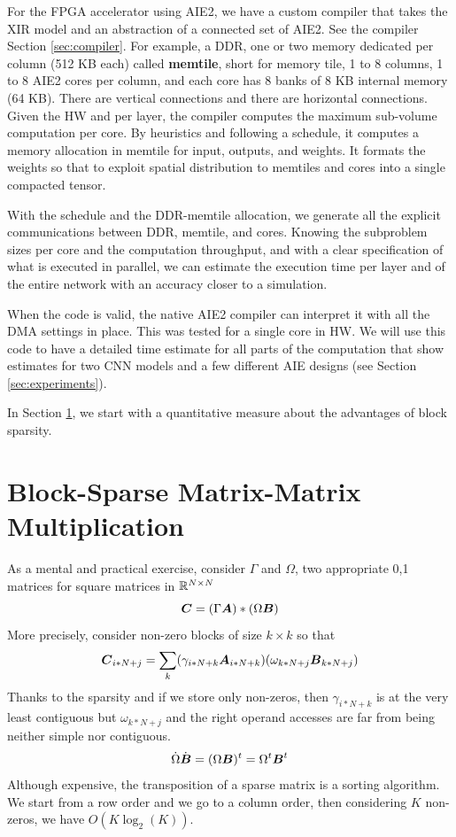 \documentclass[conference]{IEEEtran}
\begin{document}
For the FPGA accelerator using AIE2, we have a custom compiler that
takes the XIR model and an abstraction of a connected set of AIE2. See
the compiler Section \ref{sec:compiler}. For example, a DDR, one or
two memory dedicated per column (512 KB each) called {\bf memtile},
short for memory tile, 1 to 8 columns, 1 to 8 AIE2 cores per column,
and each core has 8 banks of 8 KB internal memory (64 KB). There are
vertical connections and there are horizontal connections. Given the
HW and per layer, the compiler computes the maximum sub-volume
computation per core. By heuristics and following a schedule, it
computes a memory allocation in memtile for input, outputs, and
weights. It formats the weights so that to exploit spatial
distribution to memtiles and cores into a single compacted tensor.

With the schedule and the DDR-memtile allocation, we generate all the
explicit communications between DDR, memtile, and cores. Knowing the
subproblem sizes per core and the computation throughput, and with a
clear specification of what is executed in parallel, we can estimate
the execution time per layer and of the entire network with an
accuracy closer to a simulation.

When the code is valid, the native AIE2 compiler can interpret it with
all the DMA settings in place. This was tested for a single core in
HW. We will use this code to have a detailed time estimate for all
parts of the computation that show estimates for two CNN models and a
few different AIE designs (see Section \ref{sec:experiments}).

In Section \ref{sec:motivation}, we start with a quantitative measure
about the advantages of block sparsity.

\section{Block-Sparse Matrix-Matrix Multiplication}
\label{sec:motivation}

As a mental and practical exercise, consider $\Gamma$ and $\Omega$,
two appropriate 0,1 matrices for square matrices in $\mathbb{R}^{N\times N}$
\begin{equation}
  {\boldsymbol C} = (\Gamma {\boldsymbol A}) * (\Omega {\boldsymbol B})
\end{equation}
More precisely, consider non-zero blocks of size $k\times k$ so that
\begin{equation}
  {\boldsymbol C}_{i*N+j} = \sum_k ( \gamma_{i*N+k} {\boldsymbol A}_{i*N+k} ) (\omega_{k*N+j} {\boldsymbol B}_{k*N+j})
\end{equation}
Thanks to the sparsity and if we store only non-zeros, then
$\gamma_{i*N+k}$ is at the very least contiguous but $\omega_{k*N+j}$
and the right operand accesses are far from being neither simple nor
contiguous.
\begin{equation}
  \dot{\Omega}\dot{{\boldsymbol B}} = (\Omega {\boldsymbol B})^t =\Omega^t {\boldsymbol B}^t 
\end{equation}
Although expensive, the transposition of a sparse matrix is a sorting
algorithm. We start from a row order and we go to a column order, then
considering $K$ non-zeros, we have $O(K\log_2(K))$.
\end{document}
